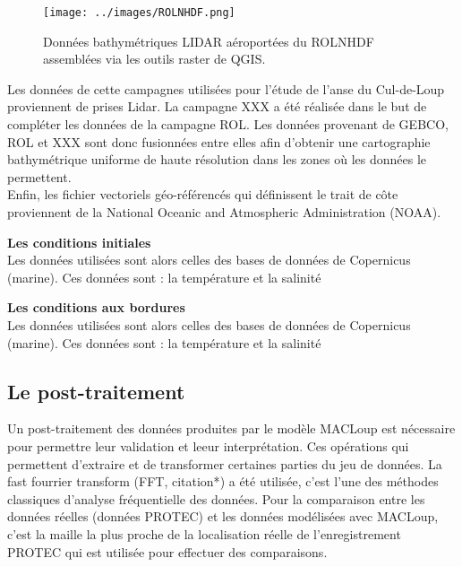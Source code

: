 \documentclass[10pt,a4paper,titlepage]{article}
\begin{document}
\begin{figure}[H]
    \centering
    \texttt{[image: ../images/ROLNHDF.png]}
    \caption{Données bathymétriques LIDAR aéroportées du ROLNHDF assemblées via les outils raster de QGIS.}
    \label{fig:ROLNHDF}
\end{figure}

Les données de cette campagnes utilisées pour l'étude de l'anse du Cul-de-Loup proviennent de prises Lidar.
La campagne XXX a été réalisée dans le but de compléter les données de la campagne ROL.
Les données provenant de GEBCO, ROL et XXX sont donc fusionnées entre elles afin d'obtenir une cartographie bathymétrique uniforme de haute résolution dans les zones où les données le permettent.
\\
Enfin, les fichier vectoriels géo-référencés qui définissent le trait de côte proviennent de la National Oceanic and Atmospheric Administration (NOAA).


\textbf{Les conditions initiales}\\
\label{par:cond_init}
Les données utilisées sont alors celles des bases de données de Copernicus (marine).
Ces données sont : la température et la salinité %


\textbf{Les conditions aux bordures}\\
\label{par:cond_bords}
Les données utilisées sont alors celles des bases de données de Copernicus (marine).
Ces données sont : la température et la salinité %


\subsection{Le post-traitement}
\label{sub:postpro}
Un post-traitement des données produites par le modèle MACLoup est nécessaire pour permettre leur validation et leeur interprétation.
Ces opérations qui permettent d'extraire et de transformer certaines parties du jeu de données.
La fast fourrier transform (FFT, \alert{citation*}) a été utilisée, c'est l'une des méthodes classiques d'analyse fréquentielle des données.
Pour la comparaison entre les données réelles (données PROTEC) et les données modélisées avec MACLoup, c'est la maille la plus proche de la localisation réelle de l'enregistrement PROTEC qui est utilisée pour effectuer des comparaisons.
\end{document}
